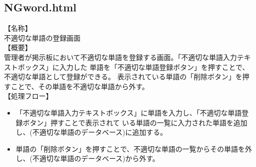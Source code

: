 \documentclass[a4j]{jarticle}
\begin{document}
\subsection{NGword.html}
【名称】
\\不適切な単語の登録画面
\\【概要】
\\管理者が掲示板において不適切な単語を登録する画面。「不適切な単語入力テキストボックス」に入力した
単語を「不適切な単語登録ボタン」を押すことで、不適切な単語として登録ができる。
表示されている単語の「削除ボタン」を押すことで、その単語を不適切な単語から外す。
\\【処理フロー】
\\\begin{itemize}
  \item 「不適切な単語入力テキストボックス」に単語を入力し、「不適切な単語登録ボタン」押すことで表示されて
  いる単語の一覧に入力された単語を追加し、(不適切な単語のデータベース)に追加する。
  \item 単語の「削除ボタン」を押すことで、不適切な単語の一覧からその単語を外し、(不適切な単語のデータベース)から外す。
\end{itemize}
\end{document}
